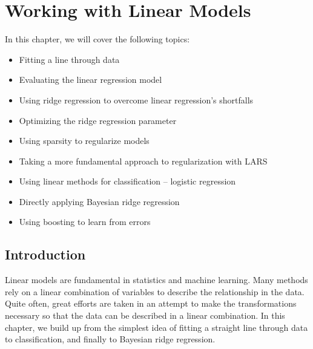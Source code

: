 \documentclass[SKL-MASTER.tex]{subfiles}
\begin{document}
\Large
\section{Working with Linear Models}
In this chapter, we will cover the following topics:
\begin{itemize}
\item Fitting a line through data
\item Evaluating the linear regression model
\item Using ridge regression to overcome linear regression's shortfalls
\item Optimizing the ridge regression parameter
\item Using sparsity to regularize models
\item Taking a more fundamental approach to regularization with LARS
\item Using linear methods for classification – logistic regression
\item Directly applying Bayesian ridge regression
\item Using boosting to learn from errors
\end{itemize}
\subsection{Introduction}
Linear models are fundamental in statistics and machine learning. Many methods rely on
a linear combination of variables to describe the relationship in the data. Quite often, great
efforts are taken in an attempt to make the transformations necessary so that the data can
be described in a linear combination.
In this chapter, we build up from the simplest idea of fitting a straight line through data to
classification, and finally to Bayesian ridge regression.
\end{document}
